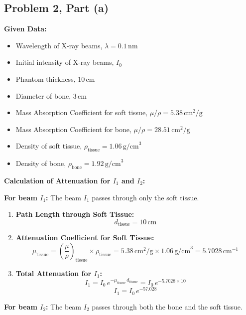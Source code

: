 \documentclass[12pt]{article}
\begin{document}
\subsection*{Problem 2, Part (a)}
\textbf{Given Data:}
\begin{itemize}
    \item Wavelength of X-ray beams, $\lambda = 0.1 \, \text{nm}$
    \item Initial intensity of X-ray beams, $I_0$
    \item Phantom thickness, $10 \, \text{cm}$
    \item Diameter of bone, $3 \, \text{cm}$
    \item Mass Absorption Coefficient for soft tissue, $\mu/\rho = 5.38 \, \text{cm}^2/\text{g}$
    \item Mass Absorption Coefficient for bone, $\mu/\rho = 28.51 \, \text{cm}^2/\text{g}$
    \item Density of soft tissue, $\rho_{\text{tissue}} = 1.06 \, \text{g/cm}^3$
    \item Density of bone, $\rho_{\text{bone}} = 1.92 \, \text{g/cm}^3$
\end{itemize}

\textbf{Calculation of Attenuation for $I_1$ and $I_2$:}

\textbf{For beam $I_1$:}
The beam $I_1$ passes through only the soft tissue.

\begin{enumerate}
    \item \textbf{Path Length through Soft Tissue:}
    \[
    d_{\text{tissue}} = 10 \, \text{cm}
    \]

    \item \textbf{Attenuation Coefficient for Soft Tissue:}
    \[
    \mu_{\text{tissue}} = \left(\frac{\mu}{\rho}\right)_{\text{tissue}} \times \rho_{\text{tissue}} = 5.38 \, \text{cm}^2/\text{g} \times 1.06 \, \text{g/cm}^3 = 5.7028 \, \text{cm}^{-1}
    \]

    \item \textbf{Total Attenuation for $I_1$:}
    \[
    I_1 = I_0 \, e^{-\mu_{\text{tissue}} \, d_{\text{tissue}}} = I_0 \, e^{-5.7028 \times 10}
    \]
    \[
    I_1 = I_0 \, e^{-57.028}
    \]
\end{enumerate}

\textbf{For beam $I_2$:}
The beam $I_2$ passes through both the bone and the soft tissue.
\end{document}
